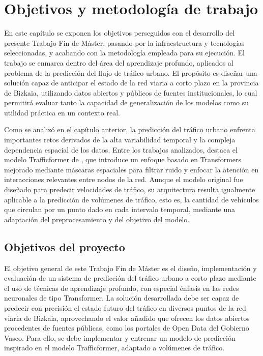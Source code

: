 \section{Objetivos y metodología de trabajo}

En este capítulo se exponen los objetivos perseguidos con el desarrollo del presente Trabajo Fin de Máster, pasando por la infraestructura y tecnologías seleccionadas, y acabando con la metodología empleada para su ejecución. El trabajo se enmarca dentro del área del aprendizaje profundo, aplicados al problema de la predicción del flujo de tráfico urbano. El propósito es diseñar una solución capaz de anticipar el estado de la red viaria a corto plazo en la provincia de Bizkaia, utilizando datos abiertos y públicos de fuentes institucionales, lo cual permitirá evaluar tanto la capacidad de generalización de los modelos como su utilidad práctica en un contexto real. 

Como se analizó en el capítulo anterior, la predicción del tráfico urbano enfrenta importantes retos derivados de la alta variabilidad temporal y la compleja dependencia espacial de los datos. Entre los trabajos analizados, destaca el modelo Trafficformer de \cite{trafficformer}, que introduce un enfoque basado en Transformers mejorado mediante máscaras espaciales para filtrar ruido y enfocar la atención en interacciones relevantes entre nodos de la red. Aunque el modelo original fue diseñado para predecir velocidades de tráfico, su arquitectura resulta igualmente aplicable a la predicción de volúmenes de tráfico, esto es, la cantidad de vehículos que circulan por un punto dado en cada intervalo temporal, mediante una adaptación del preprocesamiento y del objetivo del modelo.

\subsection{Objetivos del proyecto}

El objetivo general de este Trabajo Fin de Máster es el diseño, implementación y evaluación de un sistema de predicción del tráfico urbano a corto plazo mediante el uso de técnicas de aprendizaje profundo, con especial énfasis en las redes neuronales de tipo Transformer. La solución desarrollada debe ser capaz de predecir con precisión el estado futuro del tráfico en diversos puntos de la red viaria de Bizkaia, aprovechando el valor añadido que ofrecen los datos abiertos procedentes de fuentes públicas, como los portales de Open Data del Gobierno Vasco. Para ello, se debe implementar y entrenar un modelo de predicción inspirado en el modelo Trafficformer, adaptado a volúmenes de tráfico.


